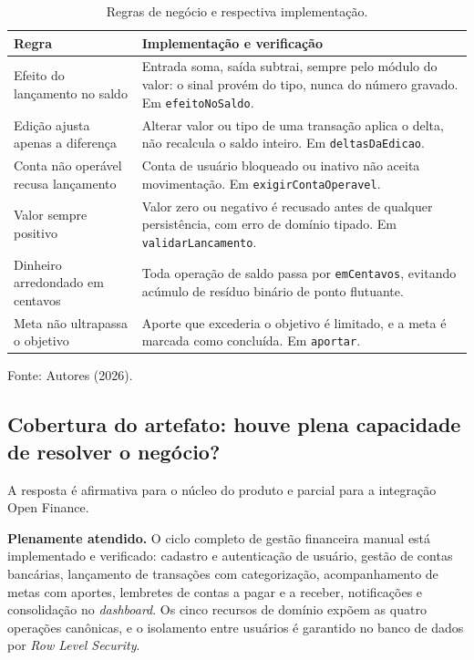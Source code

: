 \documentclass[12pt,a4paper]{article}
\begin{document}
\begin{table}[H]
\centering
\caption{Regras de negócio e respectiva implementação.}
\label{tab:regras}
\renewcommand{\arraystretch}{1.4}
\begin{tabularx}{\textwidth}{@{}>{\RaggedRight}p{4.2cm}>{\RaggedRight\arraybackslash}X@{}}
\toprule
\textbf{Regra} & \textbf{Implementação e verificação} \\
\midrule
Efeito do lançamento no saldo & Entrada soma, saída subtrai, sempre pelo módulo do valor: o sinal provém do tipo, nunca do número gravado. Em \texttt{efeitoNoSaldo}. \\
Edição ajusta apenas a diferença & Alterar valor ou tipo de uma transação aplica o delta, não recalcula o saldo inteiro. Em \texttt{deltasDaEdicao}. \\
Conta não operável recusa lançamento & Conta de usuário bloqueado ou inativo não aceita movimentação. Em \texttt{exigirContaOperavel}. \\
Valor sempre positivo & Valor zero ou negativo é recusado antes de qualquer persistência, com erro de domínio tipado. Em \texttt{validarLancamento}. \\
Dinheiro arredondado em centavos & Toda operação de saldo passa por \texttt{emCentavos}, evitando acúmulo de resíduo binário de ponto flutuante. \\
Meta não ultrapassa o objetivo & Aporte que excederia o objetivo é limitado, e a meta é marcada como concluída. Em \texttt{aportar}. \\
\bottomrule
\end{tabularx}
\vspace{0.3cm}

\noindent\footnotesize Fonte: Autores (2026).
\end{table}

\subsection{Cobertura do artefato: houve plena capacidade de resolver o negócio?}

A resposta é afirmativa para o núcleo do produto e parcial para a integração Open Finance.

\textbf{Plenamente atendido.} O ciclo completo de gestão financeira manual está implementado e verificado: cadastro e autenticação de usuário, gestão de contas bancárias, lançamento de transações com categorização, acompanhamento de metas com aportes, lembretes de contas a pagar e a receber, notificações e consolidação no \textit{dashboard}. Os cinco recursos de domínio expõem as quatro operações canônicas, e o isolamento entre usuários é garantido no banco de dados por \textit{Row Level Security}.
\end{document}
